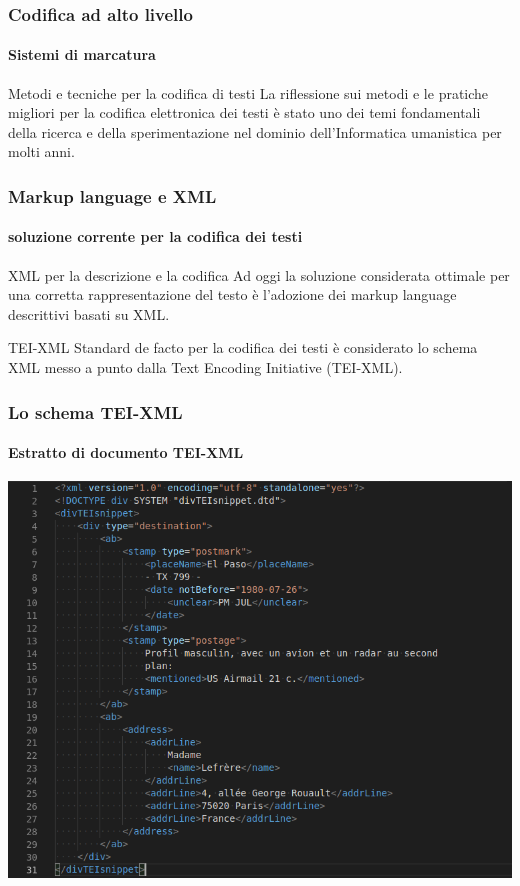 \begin{frame}
	\frametitle{Codifica ad alto livello}
	\framesubtitle{Sistemi di marcatura}
	\addtocounter{nframe}{1}

	\begin{block}{Metodi e tecniche per la codifica di testi}
		La riflessione sui metodi e le pratiche migliori per la codifica elettronica dei testi è stato uno dei temi fondamentali della ricerca e della sperimentazione nel dominio dell’Informatica umanistica per molti anni.
	\end{block}

\end{frame}

\begin{frame}
	\frametitle{Markup language e XML}
	\framesubtitle{soluzione corrente per la codifica dei testi}
	\addtocounter{nframe}{1}

	\begin{block}{XML per la descrizione e la codifica}
		Ad oggi la soluzione considerata ottimale per una corretta rappresentazione del testo è l'adozione dei markup language descrittivi basati su XML.
	\end{block}

	\begin{block}{TEI-XML}
		Standard de facto per la codifica dei testi è considerato lo schema XML messo a punto dalla Text Encoding Initiative (TEI-XML).
	\end{block}

\end{frame}

\begin{frame}
	\frametitle{Lo schema TEI-XML}
	\framesubtitle{Estratto di documento TEI-XML}
	\addtocounter{nframe}{1}

	\begin{center}
		\includegraphics[width=.9\textwidth]{imgs/DivTEISnippet.png}
	\end{center}
	
\end{frame}

